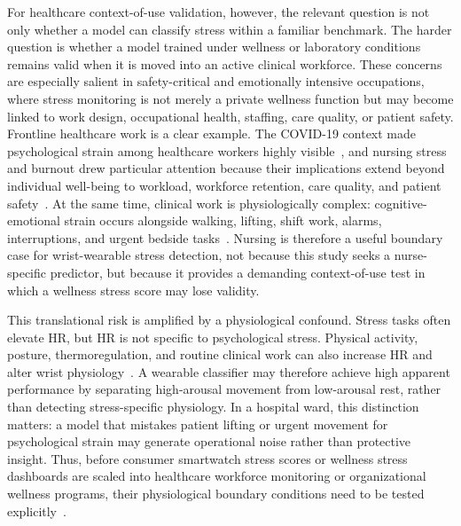 \documentclass[healthcare,article,submit,moreauthors,pdftex]{Definitions/mdpi}
\begin{document}
For healthcare context-of-use validation, however, the relevant question is not only
whether a model can classify stress within a familiar benchmark. The harder
question is whether a model trained under wellness or laboratory conditions
remains valid when it is moved into an active clinical workforce. These concerns
are especially salient in safety-critical and emotionally intensive occupations,
where stress monitoring is not merely a private wellness function but may become
linked to work design, occupational health, staffing, care quality, or patient
safety. Frontline healthcare work is a clear example. The COVID-19 context made
psychological strain among healthcare workers highly visible~\cite{lai2020mentalhealth,
sasangohar2020provider}, and nursing stress and burnout drew particular attention
because their implications extend beyond individual well-being to workload,
workforce retention, care quality, and patient safety~\cite{dallora2020burnout,
hall2016staffwellbeing}. At the same time, clinical work is physiologically
complex: cognitive-emotional strain occurs alongside walking, lifting, shift
work, alarms, interruptions, and urgent bedside
tasks~\cite{hosseini2022nurse,ruppel2023alarmburden,gulsen2025alarmfatigue}.
Nursing is therefore a useful boundary case for wrist-wearable stress detection,
not because this study seeks a nurse-specific predictor, but because it provides
a demanding context-of-use test in which a wellness stress score may lose
validity.

This translational risk is amplified by a physiological confound. Stress tasks
often elevate HR, but HR is not specific to psychological stress. Physical
activity, posture, thermoregulation, and routine clinical work can also increase
HR and alter wrist physiology~\cite{kreibig2010ans,boucsein2012eda}. A wearable
classifier may therefore achieve high apparent performance by separating
high-arousal movement from low-arousal rest, rather than detecting
stress-specific physiology. In a hospital ward, this distinction matters: a model
that mistakes patient lifting or urgent movement for psychological strain may
generate operational noise rather than protective insight. Thus, before consumer
smartwatch stress scores or wellness stress dashboards are scaled into healthcare
workforce monitoring or organizational wellness programs, their physiological
boundary conditions need to be tested
explicitly~\cite{virgillito2025wearablesorg}.
\end{document}
